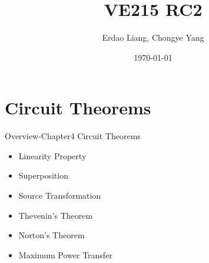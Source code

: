 \documentclass{beamer}
\title[VE215 RC2]{VE215 RC2}
\author{Erdao Liang, Chongye Yang}
\institute[UM-SJTU JI] 
{UM-SJTU JI}
\date{\today}
\begin{document}

\begin{frame}
\titlepage %
\end{frame}


\section{Circuit Theorems}

\begin{frame}{Overview-Chapter4 Circuit Theorems}
\begin{itemize}
\item Linearity Property
\newline
\item Superposition
\newline
\item Source Transformation
\newline
\item Thevenin's Theorem
\newline
\item Norton's Theorem
\newline
\item Maximum Power Transfer
\end{itemize}
\end{frame}

\end{document}
